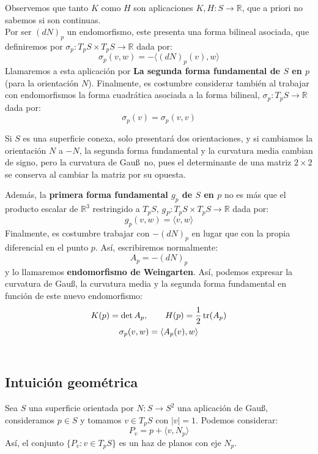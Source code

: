 \noindent
Observemos que tanto $K$ como $H$ son aplicaciones $K,H:S\to\mathbb{R}$, que a priori no sabemos si son continuas.\\

\noindent
Por ser $(dN)_p$ un endomorfismo, este presenta una forma bilineal asociada, que definiremos por $\sigma_p:T_pS\times T_pS\to\mathbb{R}$ dada por:
\begin{equation*}
    \sigma_p(v,w) = -\langle (dN)_p(v),w \rangle 
\end{equation*}
Llamaremos a esta aplicación por \textbf{La segunda forma fundamental de $S$ en $p$} (para la orientación $N$). Finalmente, es costumbre considerar también al trabajar con endomorfismos la forma cuadrática asociada a la forma bilineal, $\sigma_p:T_pS\to\mathbb{R}$ dada por:
\begin{equation*}
    \sigma_p(v) = \sigma_p(v,v)
\end{equation*}

\begin{observacion}
    Si $S$ es una superficie conexa, solo presentará dos orientaciones, y si cambiamos la orientación $N$ a $-N$, la segunda forma fundamental y la curvatura media cambian de signo, pero la curvatura de Gau\ss\ no, pues el determinante de una matriz $2\times 2$ se conserva al cambiar la matriz por su opuesta.
\end{observacion}

\noindent
Además, la \textbf{primera forma fundamental $g_p$ de $S$ en $p$} no es más que el producto escalar de $\mathbb{R}^3$ restringido a $T_pS$, $g_P:T_pS\times T_pS\to\mathbb{R}$ dada por:
\begin{equation*}
    g_p(v,w) = \langle v,w \rangle 
\end{equation*}
Finalmente, es costumbre trabajar con $-(dN)_p$ en lugar que con la propia diferencial en el punto $p$. Así, escribiremos normalmente:
\begin{equation*}
    A_p = -(dN)_p
\end{equation*}
y lo llamaremos \textbf{endomorfismo de Weingarten}. Así, podemos expresar la curvatura de Gau\ss, la curvatura media y la segunda forma fundamental en función de este nuevo endomorfismo:
\begin{gather*}
    K(p) = \det A_p, \qquad H(p) = \frac{1}{2}\operatorname{tr}(A_p) \\
    \sigma_p(v,w) = \langle A_p(v),w \rangle 
\end{gather*}~\\

\subsection{Intuición geométrica}
\noindent
Sea $S$ una superficie orientada por $N:S\to S^2$ una aplicación de Gau\ss, consideramos $p\in S$ y tomamos $v\in T_pS$ con $|v|=1$. Podemos considerar:
\begin{equation*}
    P_v = p + \langle v,N_p \rangle 
\end{equation*}
Así, el conjunto $\{P_v : v\in T_pS\}$ es un haz de planos con eje $N_p$.\\

